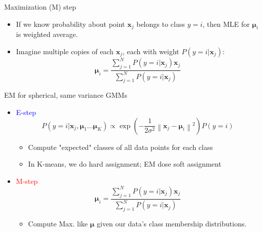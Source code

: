 \documentclass[12pt]{beamer}
\newcommand{\norm}[1]{\left\lVert#1\right\rVert}
\begin{document}
\begin{frame}{Maximization (M) step}
\begin{itemize}
	\item If we know probability about point $\bm{x}_j$ belongs to class $y=i$, then MLE for $\bm{\mu}_i$ is weighted average.
	\item Imagine multiple copies of each $\bm{x}_j$, each with weight $P(y=i|\bm{x}_j)$:
	\begin{equation} \nonumber
	\bm{\mu}_i = \frac{\sum_{j=1}^{N}P(y=i|\bm{x}_j)\bm{x}_j}{\sum_{j=1}^{N}P(y=i|\bm{x}_j)}
	\end{equation}
\end{itemize}
\end{frame}

\begin{frame}{EM for spherical, same variance GMMs}
\begin{itemize}
	\item \textcolor{blue}{E-step}
	\begin{equation} \nonumber
	P(y=i|\bm{x}_j,\bm{\mu}_1\ldots\bm{\mu}_K)\propto\exp\left( -\frac{1}{2\sigma^2}\norm{\bm{x}_j-\bm{\mu}_i}^2 \right) P(y=i)
	\end{equation}
	\begin{itemize}
		\item Compute "expected" classes of all data points for each class
		\item In K-means, we do hard assignment; EM dose soft assignment
	\end{itemize}
	\item \textcolor{red}{M-step}
	\begin{equation} \nonumber
	\bm{\mu}_i = \frac{\sum_{j=1}^{N}P(y=i|\bm{x}_j)\bm{x}_j}{\sum_{j=1}^{N}P(y=i|\bm{x}_j)}
	\end{equation}
	\begin{itemize}
		\item Compute Max. like $\bm{\mu}$ given our data's class membership distributions.
	\end{itemize}
\end{itemize}
\end{frame}
\end{document}
